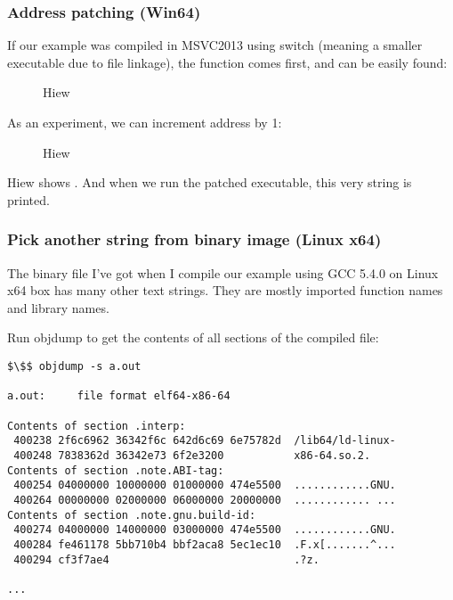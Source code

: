 \subsubsection{Address patching (Win64)}

If our example was compiled in MSVC2013 using  switch
(meaning a smaller executable due to  file linkage), the \main function comes first, and can be easily found:

\begin{figure}[H]
\centering
{}
\caption{Hiew}
\label{}
\end{figure}

As an experiment, we can \gls{increment} address by 1:

\begin{figure}[H]
\centering
{}
\caption{Hiew}
\label{}
\end{figure}

Hiew shows .
And when we run the patched executable, this very string is printed.

\subsubsection{Pick another string from binary image (Linux x64)}

The binary file I've got when I compile our example using GCC 5.4.0 on Linux x64 box has many other text strings.
They are mostly imported function names and library names.

Run objdump to get the contents of all sections of the compiled file:

\begin{lstlisting}[basicstyle=\ttfamily, mathescape]
$\$$ objdump -s a.out

a.out:     file format elf64-x86-64

Contents of section .interp:
 400238 2f6c6962 36342f6c 642d6c69 6e75782d  /lib64/ld-linux-
 400248 7838362d 36342e73 6f2e3200           x86-64.so.2.
Contents of section .note.ABI-tag:
 400254 04000000 10000000 01000000 474e5500  ............GNU.
 400264 00000000 02000000 06000000 20000000  ............ ...
Contents of section .note.gnu.build-id:
 400274 04000000 14000000 03000000 474e5500  ............GNU.
 400284 fe461178 5bb710b4 bbf2aca8 5ec1ec10  .F.x[.......^...
 400294 cf3f7ae4                             .?z.

...
\end{lstlisting}

